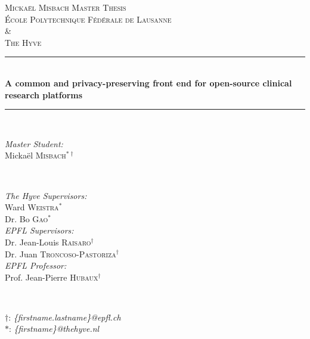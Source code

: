 \begin{titlepage}

\newcommand{\HRule}{\rule{\linewidth}{0.5mm}}
\center
 
\textsc{\LARGE Mickaël Misbach Master Thesis}\\[0.5cm]

\textsc{\Large École Polytechnique Fédérale de Lausanne}\\ 
\textsc{\Large \&}\\ 
\textsc{\Large The Hyve}\\[0.5cm] 

\HRule \\[0.4cm]
{ \huge \bfseries A common and privacy-preserving front end for open-source clinical research platforms}\\[0.4cm]
\HRule \\[1cm]
 
\begin{minipage}{0.4\textwidth}
\begin{flushleft} \large
\emph{Master Student:}\\
Mickaël \textsc{Misbach}$^{*\dagger}$\\
\end{flushleft}
\end{minipage}
~
\begin{minipage}{0.4\textwidth}
\begin{flushright} \large
\emph{The Hyve Supervisors:} \\
Ward \textsc{Weistra}$^*$\\
Dr. Bo \textsc{Gao}$^*$\\[\baselineskip]
\emph{EPFL Supervisors:} \\
Dr. Jean-Louis \textsc{Raisaro}$^\dagger$\\
Dr. Juan \textsc{Troncoso-Pastoriza}$^\dagger$\\[\baselineskip]
\emph{EPFL Professor:} \\
Prof. Jean-Pierre \textsc{Hubaux}$^\dagger$\\
\end{flushright}
\end{minipage}
~ \\[0.5cm]
\begin{minipage}{1\textwidth}
\begin{flushbottom}
\centering\small
$\dagger$: \emph{\{firstname.lastname\}@epfl.ch} \\
$*$: \emph{\{firstname\}@thehyve.nl} \\
\end{flushbottom}
\end{minipage}\\[2cm]



\end{titlepage}
